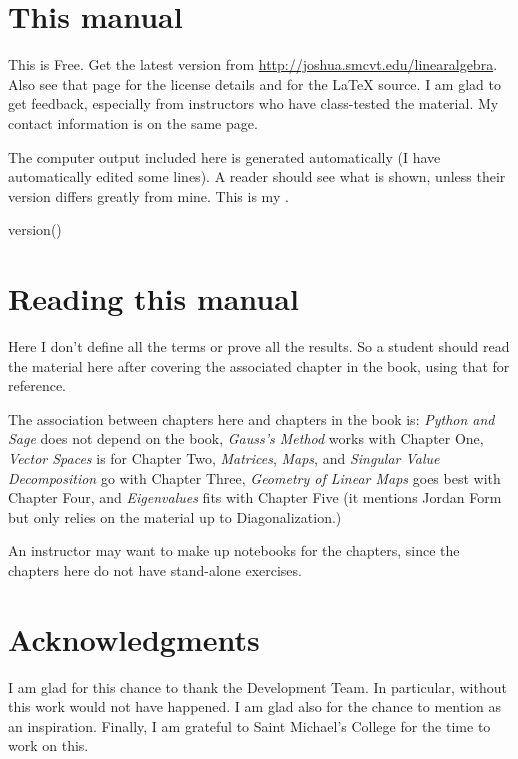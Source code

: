 \section{This manual}
This is Free.
Get the latest version from 
\url{http://joshua.smcvt.edu/linearalgebra}.
Also see that page for the license details and for 
the \LaTeX{} source.
I am glad to get feedback, especially from instructors
who have class-tested the material.
My contact information is on the same page. 

The computer output included here is generated automatically 
(I have automatically edited some lines).
A reader should see what is shown, unless their version differs
greatly from mine.
This is my \Sage.
\begin{sageoutput}[d,0,1]
version()  
\end{sageoutput}



\section{Reading this manual}
Here I don't define all the terms or prove all the results.
So a student should read the material here after covering the associated
chapter in the book, using that for reference.

The association between chapters here and chapters in the book is:
\textit{Python and Sage} does not depend on the
book,
\textit{Gauss’s Method} works with Chapter One,
\textit{Vector Spaces} is for Chapter Two,
\textit{Matrices}, 
\textit{Maps}, and 
\textit{Singular Value Decomposition} go with Chapter Three,
\textit{Geometry of Linear Maps} goes best with Chapter Four,
and \textit{Eigenvalues} fits with Chapter Five
(it mentions Jordan Form but only relies on the material up to 
Diagonalization.)

An instructor may want to make up \Sage{} notebooks for the chapters,
since the chapters here do not have stand-alone exercises.




\section{Acknowledgments}
I am glad for this chance to thank the \Sage{} Development Team.
In particular,
without \citep{SageTeam12ref} this work would not have happened.
I am glad also for the chance to mention 
\citep{Beezer11} as an inspiration.
Finally, I am grateful to Saint Michael's College for the time to work on this.





